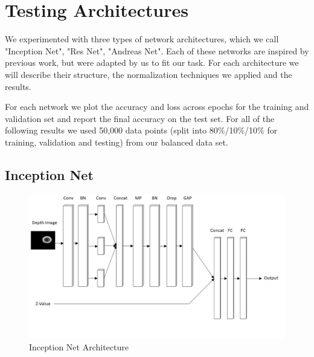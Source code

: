 
\section{Testing Architectures}
\label{sec:archs}

We experimented with three types of network architectures, which we call "Inception Net", "Res Net", "Andreas Net". 
Each of these networks are inspired by previous work, but were adapted by us to fit our task. 
For each architecture we will describe their structure, the normalization techniques we applied and the results. 
 


For each network we plot the accuracy and loss across epochs for the training and validation set and report the final accuracy on the test set. 
For all of the following results we used 50,000 data points (split into 80\%/10\%/10\% for training, validation and testing) from our balanced data set. 


\subsection{Inception Net}

\begin{figure}[t!]
    \includegraphics[width=0.99\columnwidth]{figs/inception_net.png}
\caption{Inception Net Architecture} \label{fig:inception_net}
\end{figure}

